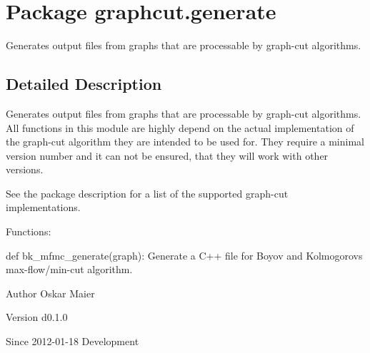 \hypertarget{namespacegraphcut_1_1generate}{
\section{Package graphcut.generate}
\label{namespacegraphcut_1_1generate}
}


Generates output files from graphs that are processable by graph-\/cut algorithms.  




\subsection{Detailed Description}
Generates output files from graphs that are processable by graph-\/cut algorithms. All functions in this module are highly depend on the actual implementation of the graph-\/cut algorithm they are intended to be used for. They require a minimal version number and it can not be ensured, that they will work with other versions.

See the package description for a list of the supported graph-\/cut implementations.

Functions:
\begin{DoxyItemize}
\item def bk\_\-mfmc\_\-generate(graph): Generate a C++ file for Boyov and Kolmogorovs max-\/flow/min-\/cut algorithm.
\end{DoxyItemize}

\begin{DoxyAuthor}{Author}
Oskar Maier 
\end{DoxyAuthor}
\begin{DoxyVersion}{Version}
d0.1.0 
\end{DoxyVersion}
\begin{DoxySince}{Since}
2012-\/01-\/18  Development 
\end{DoxySince}

